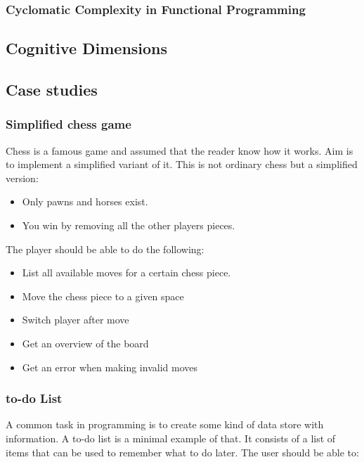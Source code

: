 \documentclass[12pt]{article}
\begin{document}
\subsubsection{Cyclomatic Complexity in Functional Programming}

\subsection{Cognitive Dimensions}

\subsection{Case studies}

\subsubsection{Simplified chess game}

Chess is a famous game and assumed that the reader know how it works. Aim
is to implement a simplified variant of it. This is not ordinary chess but a
simplified version:

\begin{itemize} 
    \item Only pawns and horses exist.
    \item You win by removing all the other players pieces.
\end{itemize}

The player should be able to do the following:

\begin{itemize} 
    \item List all available moves for a certain chess piece. 
    \item Move the chess piece to a given space
    \item Switch player after move
    \item Get an overview of the board
    \item Get an error when making invalid moves
\end{itemize}

\subsubsection{to-do List}

A common task in programming is to create some kind of data store with
information. A to-do list is a minimal example of that. It consists of a list of
items that can be used to remember what to do later. The user should be able to:
\end{document}
